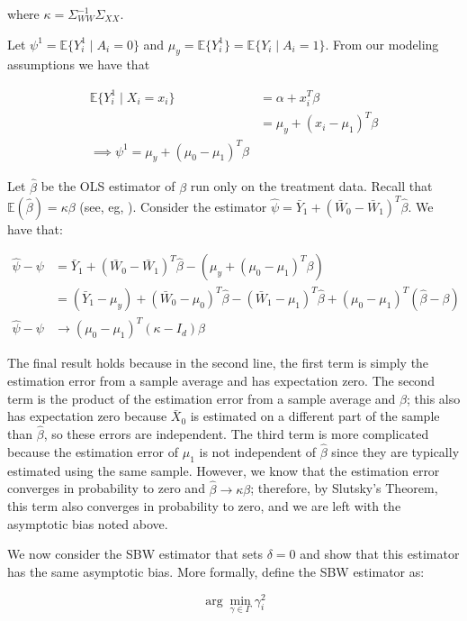 \documentclass[12pt]{article}
\begin{document}
where $\kappa = \Sigma_{WW}^{-1}\Sigma_{XX}$.

Let $\psi^1 = \mathbb{E}\{Y_i^1 \mid A_i = 0\}$ and $\mu_y = \mathbb{E}\{Y_i^1\} = \mathbb{E}\{Y_i \mid A_i = 1\}$. From our modeling assumptions we have that

\begin{align*}
    \mathbb{E}\{Y_i^1 \mid X_i = x_i\} &= \alpha + x_i^T\beta \\
    &= \mu_y + (x_i - \mu_1)^T\beta \\
    \implies \psi^1 = \mu_y + (\mu_0 - \mu_1)^T\beta
\end{align*}

Let $\hat{\beta}$ be the OLS estimator of $\beta$ run only on the treatment data. Recall that $\mathbb{E}(\hat{\beta}) = \kappa\beta$ (see, eg, \cite{gleser1992importance}). Consider the estimator $\hat{\psi} = \bar{Y}_1 + (\bar{W}_0 - \bar{W}_1)^T\hat{\beta}$. We have that: 

\begin{align*}
    \hat{\psi} - \psi &= \bar{Y}_1 + (\bar{W}_0 - \bar{W}_1)^T\hat{\beta} - (\mu_y + (\mu_0 - \mu_1)^T\beta) \\
    &= (\bar{Y}_1 - \mu_y) + (\bar{W}_0 - \mu_0)^T\hat{\beta} - (\bar{W}_1 - \mu_1)^T\hat{\beta} + (\mu_0 - \mu_1)^T(\hat{\beta} - \beta) \\
    \hat{\psi} - \psi &\to (\mu_0 - \mu_1)^T(\kappa - I_d)\beta
\end{align*}

The final result holds because in the second line, the first term is simply the estimation error from a sample average and has expectation zero. The second term is the product of the estimation error from a sample average and $\hat{\beta}$; this also has expectation zero because $\bar{X}_0$ is estimated on a different part of the sample than $\hat{\beta}$, so these errors are independent. The third term is more complicated because the estimation error of $\mu_1$ is not independent of $\hat{\beta}$ since they are typically estimated using the same sample. However, we know that the estimation error converges in probability to zero and $\hat{\beta} \to \kappa\beta$; therefore, by Slutsky's Theorem, this term also converges in probability to zero, and we are left with the asymptotic bias noted above. 

We now consider the SBW estimator that sets $\delta = 0$ and show that this estimator has the same asymptotic bias. More formally, define the SBW estimator as:

$$
\arg\min_{\gamma \in \Gamma} \gamma_i^2
$$
\end{document}
